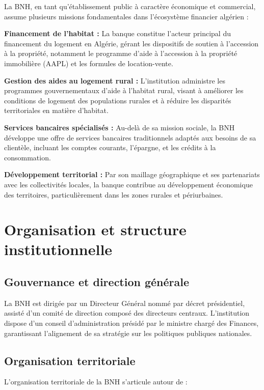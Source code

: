 La BNH, en tant qu'établissement public à caractère économique et commercial, assume plusieurs missions fondamentales dans l'écosystème financier algérien :

\medskip

\textbf{Financement de l'habitat :} La banque constitue l'acteur principal du financement du logement en Algérie, gérant les dispositifs de soutien à l'accession à la propriété, notamment le programme d'aide à l'accession à la propriété immobilière (AAPL) et les formules de location-vente.

\textbf{Gestion des aides au logement rural :} L'institution administre les programmes gouvernementaux d'aide à l'habitat rural, visant à améliorer les conditions de logement des populations rurales et à réduire les disparités territoriales en matière d'habitat.

\textbf{Services bancaires spécialisés :} Au-delà de sa mission sociale, la BNH développe une offre de services bancaires traditionnels adaptés aux besoins de sa clientèle, incluant les comptes courants, l'épargne, et les crédits à la consommation.

\textbf{Développement territorial :} Par son maillage géographique et ses partenariats avec les collectivités locales, la banque contribue au développement économique des territoires, particulièrement dans les zones rurales et périurbaines.

\section{Organisation et structure institutionnelle}

\subsection{Gouvernance et direction générale}

La BNH est dirigée par un Directeur Général nommé par décret présidentiel, assisté d'un comité de direction composé des directeurs centraux. L'institution dispose d'un conseil d'administration présidé par le ministre chargé des Finances, garantissant l'alignement de sa stratégie sur les politiques publiques nationales.

\subsection{Organisation territoriale}

L'organisation territoriale de la BNH s'articule autour de :

